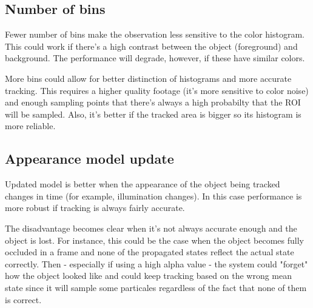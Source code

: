 \documentclass[10pt,a4paper,twoside]{article}
\begin{document}
\subsection{Number of bins}

Fewer number of bins make the observation less sensitive to the color histogram.
This could work if there's a high contrast between the object (foreground) and
background. The performance will degrade, however, if these have similar colors.

More bins could allow for better distinction of histograms and more accurate tracking. This requires a
higher quality footage (it's more sensitive to color noise) and enough sampling
points that there's always a high probabilty that the ROI will be sampled. Also,
it's better if the tracked area is bigger so its histogram is more reliable.

\subsection{Appearance model update}
Updated model is better when the appearance of the object being tracked changes
in time (for example, illumination changes). In this case performance is more
robust if tracking is always fairly accurate.

The disadvantage becomes clear when it's not always accurate enough and the object is
lost. For instance, this could be the case when the object becomes fully
occluded in a frame and
none of the propagated states reflect the actual state correctly. Then
- especially if using a high alpha value - the system could "forget" how the object looked
like and could keep tracking based on the wrong mean state since it will sample
some particales regardless of the fact that none of them is correct.



\end{document}
